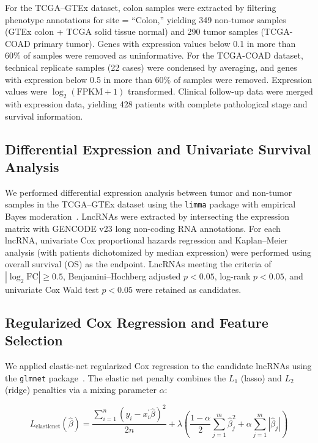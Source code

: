 \documentclass[12pt,a4paper]{article}
\begin{document}
For the TCGA--GTEx dataset, colon samples were extracted by filtering phenotype annotations for site = ``Colon,'' yielding 349 non-tumor samples (GTEx colon + TCGA solid tissue normal) and 290 tumor samples (TCGA-COAD primary tumor). Genes with expression values below 0.1 in more than 60\% of samples were removed as uninformative. For the TCGA-COAD dataset, technical replicate samples (22 cases) were condensed by averaging, and genes with expression below 0.5 in more than 60\% of samples were removed. Expression values were $\log_2(\text{FPKM}+1)$ transformed. Clinical follow-up data were merged with expression data, yielding 428 patients with complete pathological stage and survival information.

\subsection{Differential Expression and Univariate Survival Analysis}

We performed differential expression analysis between tumor and non-tumor samples in the TCGA--GTEx dataset using the \texttt{limma} package with empirical Bayes moderation~\cite{ref20}. LncRNAs were extracted by intersecting the expression matrix with GENCODE v23 long non-coding RNA annotations. For each lncRNA, univariate Cox proportional hazards regression and Kaplan--Meier analysis (with patients dichotomized by median expression) were performed using overall survival (OS) as the endpoint. LncRNAs meeting the criteria of $|\log_2\text{FC}| \geq 0.5$, Benjamini--Hochberg adjusted $p < 0.05$, log-rank $p < 0.05$, and univariate Cox Wald test $p < 0.05$ were retained as candidates.

\subsection{Regularized Cox Regression and Feature Selection}

We applied elastic-net regularized Cox regression to the candidate lncRNAs using the \texttt{glmnet} package~\cite{ref21,ref22}. The elastic net penalty combines the $L_1$ (lasso) and $L_2$ (ridge) penalties via a mixing parameter $\alpha$:

\begin{equation}
L_{\text{elasticnet}}(\hat{\beta}) = \frac{\sum_{i=1}^{n}(y_i - x_i^{\prime}\hat{\beta})^2}{2n} + \lambda\left(\frac{1-\alpha}{2}\sum_{j=1}^{m}\hat{\beta}_j^2 + \alpha\sum_{j=1}^{m}|\hat{\beta}_j|\right)
\end{equation}
\end{document}
